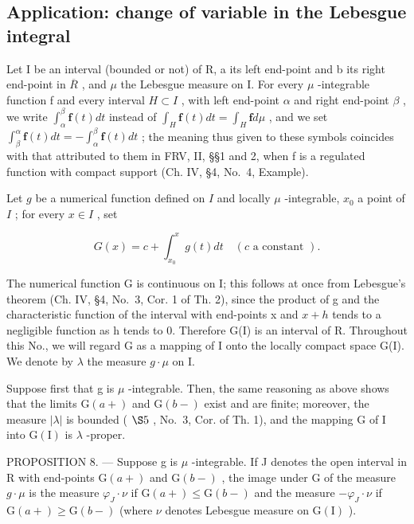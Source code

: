 \subsection{Application: change of variable in the Lebesgue integral}

Let I be an interval (bounded or not) of R, a its left end-point and b its right end-point in \(\overline{R}\) , and \(\mu\) the Lebesgue measure on I. For every \(\mu\) -integrable function f and every interval \(H \subset I\) , with left end-point \(\alpha\) and right end-point \(\beta\) , we write \(\int_{\alpha}^{\beta} \mathbf{f}(t) dt\) instead of \(\int_{H} \mathbf{f}(t) dt = \int_{H} \mathbf{f} d\mu\) , and we set \(\int_{\beta}^{\alpha} \mathbf{f}(t) dt = -\int_{\alpha}^{\beta} \mathbf{f}(t) dt\) ; the meaning thus given to these symbols coincides with that attributed to them in FRV, II, §§1 and 2, when f is a regulated function with compact support (Ch. IV, §4, No.~4, Example).

Let \(g\) be a numerical function defined on \(I\) and locally \(\mu\) -integrable, \(x_0\) a point of \(I\) ; for every \(x \in I\) , set

\[
G (x) = c + \int_ {x _ {0}} ^ {x} g (t) d t \quad (c \text {   a   constant }).\tag{11}
\]

The numerical function G is continuous on I; this follows at once from Lebesgue's theorem (Ch. IV, §4, No.~3, Cor. 1 of Th. 2), since the product of g and the characteristic function of the interval with end-points x and \(x + h\) tends to a negligible function as h tends to 0. Therefore G(I) is an interval of R. Throughout this No., we will regard G as a mapping of I onto the locally compact space G(I). We denote by \(\lambda\) the measure \(g \cdot \mu\) on I.

Suppose first that g is \(\mu\) -integrable. Then, the same reasoning as above shows that the limits \(\mathrm{G}(a+)\) and \(\mathrm{G}(b-)\) exist and are finite; moreover, the measure \(|\lambda|\) is bounded ( \(\S5\) , No.~3, Cor. of Th. 1), and the mapping G of I into \(\mathrm{G}(\mathrm{I})\) is \(\lambda\) -proper.

PROPOSITION 8. --- Suppose g is \(\mu\) -integrable. If J denotes the open interval in R with end-points \(\mathrm{G}(a+)\) and \(\mathrm{G}(b-)\) , the image under G of the measure \(g \cdot \mu\) is the measure \(\varphi_{J} \cdot \nu\) if \(\mathrm{G}(a+) \leqslant \mathrm{G}(b-)\) and the measure \(-\varphi_{J} \cdot \nu\) if \(\mathrm{G}(a+) \geqslant \mathrm{G}(b-)\) (where \(\nu\) denotes Lebesgue measure on \(\mathrm{G}(\mathrm{I})\) ).


